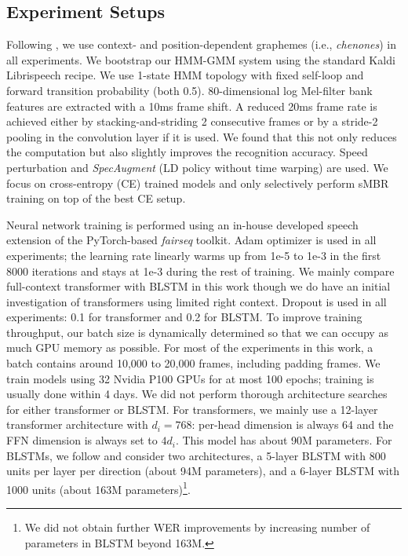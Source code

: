 \documentclass{article}
\begin{document}
\subsection{Experiment Setups}

Following \cite{le2019senones}, we use context- and position-dependent graphemes (i.e., \textit{chenones}) in all experiments. We bootstrap our HMM-GMM system using the standard Kaldi \cite{Povey_ASRU2011} Librispeech recipe. We use 1-state HMM topology with fixed self-loop and forward transition probability (both 0.5). 80-dimensional log Mel-filter bank features are extracted with a 10ms frame shift. A reduced 20ms frame rate is achieved either by stacking-and-striding 2 consecutive frames or by a stride-2 pooling in the convolution layer if it is used. We found that this not only reduces the computation but also slightly improves the recognition accuracy. Speed perturbation \cite{ko2015audio} and \emph{SpecAugment} \cite{park2019specaugment} (LD policy without time warping) are used. We focus on cross-entropy (CE) trained models and only selectively perform sMBR \cite{vesely2013sequence} training on top of the best CE setup. 

Neural network training is performed using an in-house developed speech extension of the PyTorch-based \emph{fairseq}\cite{ott2019fairseq} toolkit. 
Adam optimizer \cite{kingma2014adam} is used in all experiments; the learning rate linearly warms up from 1e-5 to 1e-3 in the first 8000 iterations and stays at 1e-3 during the rest of training. We mainly compare full-context transformer with BLSTM in this work though we do have an initial investigation of transformers using limited right context. Dropout is used in all experiments: 0.1 for transformer and 0.2 for BLSTM. To improve training throughput, our batch size is dynamically determined so that we can occupy as much GPU memory as possible. For most of the experiments in this work, a batch contains around 10,000 to 20,000 frames, including padding frames. We train models using 32 Nvidia P100 GPUs for at most 100 epochs; training is usually done within 4 days. We did not perform thorough architecture searches for either transformer or BLSTM. For transformers, we mainly use a 12-layer transformer architecture with $d_i = 768$: per-head dimension is always 64 and the FFN dimension is always set to $4 d_i$. This model has about 90M parameters. For BLSTMs, we follow \cite{le2019senones} and consider two architectures, a 5-layer BLSTM with 800 units per layer per direction (about 94M parameters), and a 6-layer BLSTM with 1000 units (about 163M parameters)\footnote{We did not obtain further WER improvements by increasing number of parameters in BLSTM beyond 163M.}. 
\end{document}
